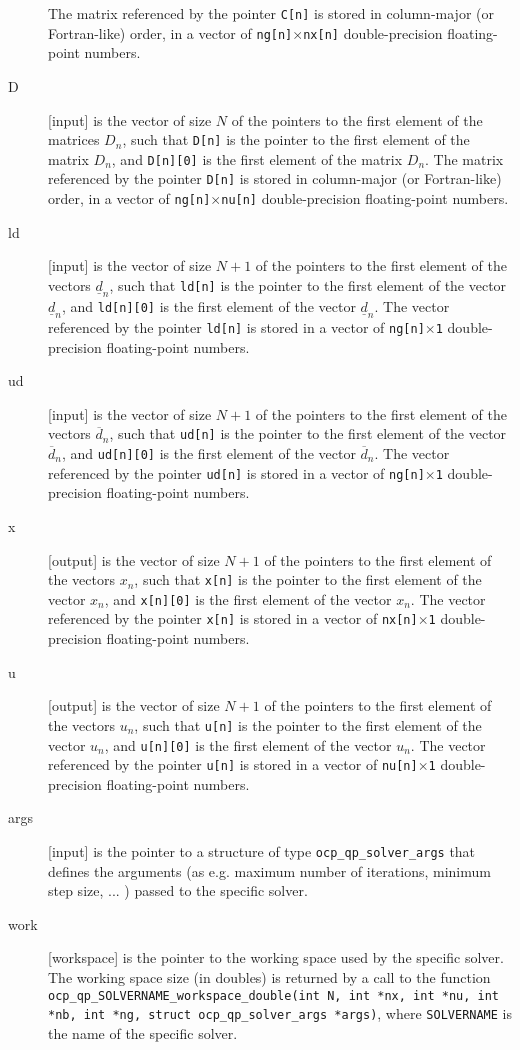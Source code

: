 \documentclass{report}
\begin{document}
\begin{description}
The matrix referenced by the pointer {\tt C[n]} is stored in column-major (or Fortran-like) order, in a vector of {\tt ng[n]$\times$nx[n]} double-precision floating-point numbers.
\item[D] [input] is the vector of size $N$ of the pointers to the first element of the matrices $D_n$, such that {\tt D[n]} is the pointer to the first element of the matrix $D_n$, and {\tt D[n][0]} is the first element of the matrix $D_n$.
The matrix referenced by the pointer {\tt D[n]} is stored in column-major (or Fortran-like) order, in a vector of {\tt ng[n]$\times$nu[n]} double-precision floating-point numbers.
\item[ld] [input] is the vector of size $N+1$ of the pointers to the first element of the vectors $\underline d_n$, such that {\tt ld[n]} is the pointer to the first element of the vector $\underline d_n$, and {\tt ld[n][0]} is the first element of the vector $\underline d_n$.
The vector referenced by the pointer {\tt ld[n]} is stored in a vector of {\tt ng[n]$\times$1} double-precision floating-point numbers.
\item[ud] [input] is the vector of size $N+1$ of the pointers to the first element of the vectors $\overline d_n$, such that {\tt ud[n]} is the pointer to the first element of the vector $\overline d_n$, and {\tt ud[n][0]} is the first element of the vector $\overline d_n$.
The vector referenced by the pointer {\tt ud[n]} is stored in a vector of {\tt ng[n]$\times$1} double-precision floating-point numbers.
\item[x] [output] is the vector of size $N+1$ of the pointers to the first element of the vectors $x_n$, such that {\tt x[n]} is the pointer to the first element of the vector $x_n$, and {\tt x[n][0]} is the first element of the vector $x_n$.
The vector referenced by the pointer {\tt x[n]} is stored in a vector of {\tt nx[n]$\times$1} double-precision floating-point numbers.
\item[u] [output] is the vector of size $N+1$ of the pointers to the first element of the vectors $u_n$, such that {\tt u[n]} is the pointer to the first element of the vector $u_n$, and {\tt u[n][0]} is the first element of the vector $u_n$.
The vector referenced by the pointer {\tt u[n]} is stored in a vector of {\tt nu[n]$\times$1} double-precision floating-point numbers.
\item[args] [input] is the pointer to a structure of type {\tt ocp\_qp\_solver\_args} that defines the arguments (as e.g. maximum number of iterations, minimum step size, ... ) passed to the specific solver.
\item[work] [workspace] is the pointer to the working space used by the specific solver.
The working space size (in doubles) is returned by a call to the function {\tt ocp\_qp\_SOLVERNAME\_workspace\_double(int N, int *nx, int *nu, int *nb, int *ng, struct ocp\_qp\_solver\_args *args)}, where {\tt SOLVERNAME} is the name of the specific solver.
\end{description}
\end{document}
